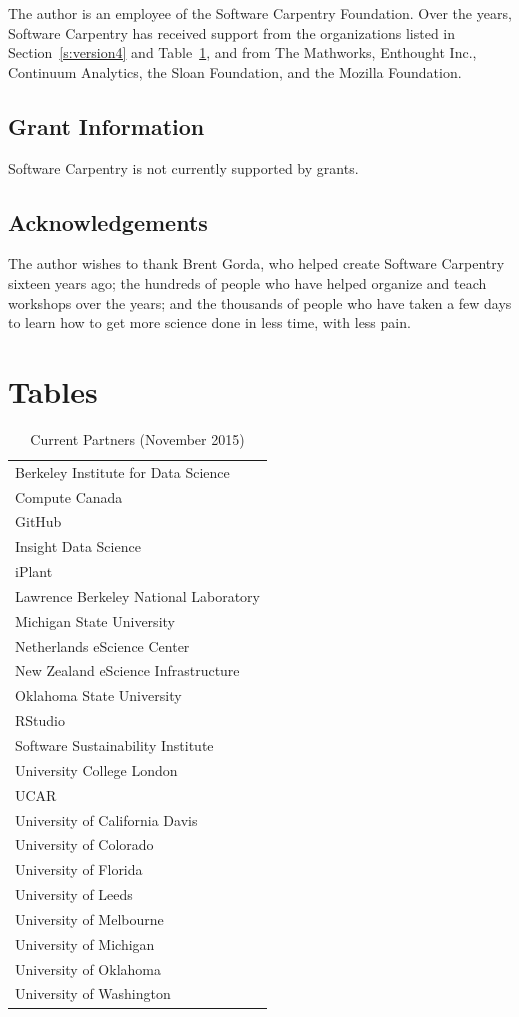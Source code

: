 \documentclass[10pt,a4paper,twocolumn]{article}
\begin{document}
The author is an employee of the Software Carpentry Foundation. Over
the years, Software Carpentry has received support from the
organizations listed in Section~\ref{s:version4} and
Table~\ref{t:current-partners}, and from The Mathworks, Enthought
Inc., Continuum Analytics, the Sloan Foundation, and the Mozilla
Foundation.

\subsection{Grant Information}

Software Carpentry is not currently supported by grants.

\subsection{Acknowledgements}

The author wishes to thank Brent Gorda, who helped create Software
Carpentry sixteen years ago; the hundreds of people who have helped
organize and teach workshops over the years; and the thousands of
people who have taken a few days to learn how to get more science
done in less time, with less pain.

\section{Tables}

\begin{table}[h]
\begin{tabular}{l}
Berkeley Institute for Data Science \\
Compute Canada \\
GitHub \\
Insight Data Science \\
iPlant \\
Lawrence Berkeley National Laboratory \\
Michigan State University \\
Netherlands eScience Center \\
New Zealand eScience Infrastructure \\
Oklahoma State University \\
RStudio \\
Software Sustainability Institute \\
University College London \\
UCAR \\
University of California Davis \\
University of Colorado \\
University of Florida \\
University of Leeds \\
University of Melbourne \\
University of Michigan \\
University of Oklahoma \\
University of Washington \\
\end{tabular}
\caption{Current Partners (November 2015)}
\label{t:current-partners}
\end{table}
\end{document}
